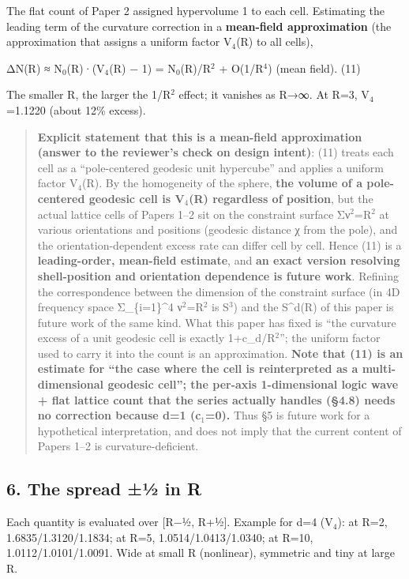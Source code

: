 \documentclass[
]{ltjsarticle}
\begin{document}
The flat count of Paper 2 assigned hypervolume 1 to each cell.
Estimating the leading term of the curvature correction in a
\textbf{mean-field approximation} (the approximation that assigns a
uniform factor V\(_{4}\)(R) to all cells),

ΔN(R) ≈ N\(_{0}\)(R)·(V\(_{4}\)(R) − 1) = N\(_{0}\)(R)/R\(^{2}\) +
O(1/R\(^{4}\)) (mean field). (11)

The smaller R, the larger the 1/R\(^{2}\) effect; it vanishes as R→∞. At
R=3, V\(_{4}\)=1.1220 (about 12\% excess).

\begin{quote}
\textbf{Explicit statement that this is a mean-field approximation
(answer to the reviewer's check on design intent)}: (11) treats each
cell as a ``pole-centered geodesic unit hypercube'' and applies a
uniform factor V\(_{4}\)(R). By the homogeneity of the sphere,
\textbf{the volume of a pole-centered geodesic cell is V\(_{4}\)(R)
regardless of position}, but the actual lattice cells of Papers 1--2 sit
on the constraint surface Σν\(^{2}\)=R\(^{2}\) at various orientations
and positions (geodesic distance χ from the pole), and the
orientation-dependent excess rate can differ cell by cell. Hence (11) is
a \textbf{leading-order, mean-field estimate}, and \textbf{an exact
version resolving shell-position and orientation dependence is future
work}. Refining the correspondence between the dimension of the
constraint surface (in 4D frequency space Σ\_\{i=1\}\^{}4
ν\(^{2}\)=R\(^{2}\) is S\(^{3}\)) and the S\^{}d(R) of this paper is
future work of the same kind. What this paper has fixed is ``the
curvature excess of a unit geodesic cell is exactly 1+c\_d/R\(^{2}\)'';
the uniform factor used to carry it into the count is an approximation.
\textbf{Note that (11) is an estimate for ``the case where the cell is
reinterpreted as a multi-dimensional geodesic cell''; the per-axis
1-dimensional logic wave + flat lattice count that the series actually
handles (§4.8) needs no correction because d=1 (c\(_{1}\)=0).} Thus §5
is future work for a hypothetical interpretation, and does not imply
that the current content of Papers 1--2 is curvature-deficient.
\end{quote}

\subsection{6. The spread ±½ in R}\label{the-spread-uxbd-in-r}

Each quantity is evaluated over {[}R−½, R+½{]}. Example for d=4
(V\(_{4}\)): at R=2, 1.6835/1.3120/1.1834; at R=5, 1.0514/1.0413/1.0340;
at R=10, 1.0112/1.0101/1.0091. Wide at small R (nonlinear), symmetric
and tiny at large R.
\end{document}
